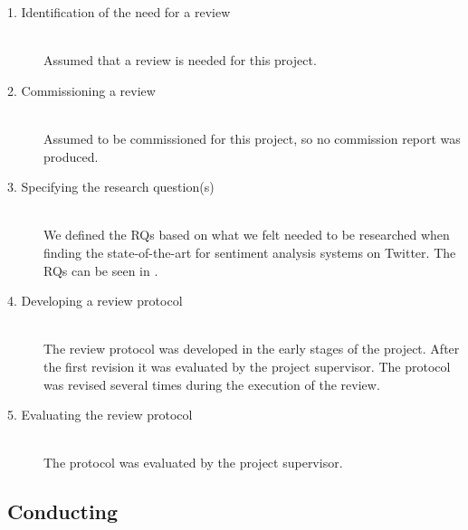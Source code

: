\begin{description}

	\item[1. Identification of the need for a review] \hfill \\
		Assumed that a review is needed for this project. 
		
	\item[2. Commissioning a review] \hfill \\
		Assumed to be commissioned for this project, so no commission report was produced. 

	\item[3. Specifying the research question(s)] \hfill \\
		We defined the RQs based on what we felt needed to be researched when finding the state-of-the-art for sentiment analysis systems on Twitter. The RQs can be seen in . 

	\item[4. Developing a review protocol] \hfill \\
		The review protocol was developed in the early stages of the project. After the first revision it was evaluated by the project supervisor. The protocol was revised several times during the execution of the review.
	

	\item[5. Evaluating the review protocol] \hfill \\
		The protocol was evaluated by the project supervisor. 

\end{description}


\subsection{Conducting}

